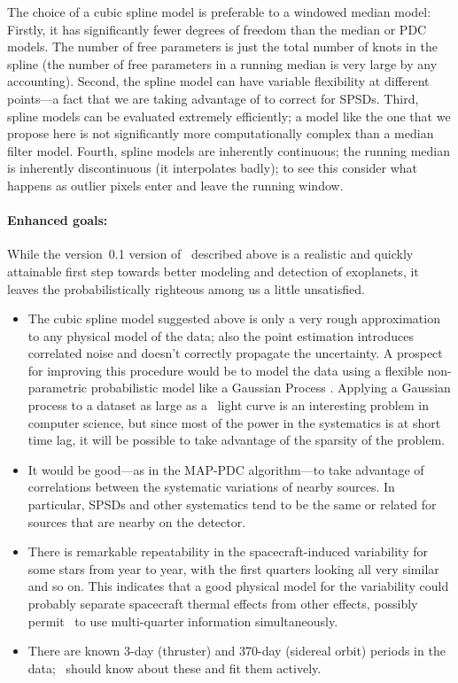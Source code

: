 \documentclass[letterpaper,12pt,preprint]{hack_aastex}
\newcommand{\Untrendy}{\package{Untrendy}}
\begin{document}
The choice of a cubic spline model is
preferable to a windowed median model:
Firstly, it has significantly fewer degrees of freedom than the median or PDC models.
The number of free parameters is just the total number of knots
in the spline (the number of free parameters in a running median is
very large by any
accounting).
Second, the spline model can have variable flexibility at
different points---a fact that we are taking advantage of to correct for
SPSDs.
Third, spline models can be evaluated extremely efficiently; a model
like the one that we propose here is not significantly more computationally
complex than a median filter model.
Fourth, spline models are inherently continuous; the running median is
inherently discontinuous (it interpolates badly); to see this consider what
happens as outlier pixels enter and leave the running window.

\paragraph{Enhanced goals:}
While the version~0.1 version of \Untrendy\ described above is a realistic and
quickly attainable first step towards better modeling and detection of
exoplanets, it leaves the probabilistically
righteous among us a little unsatisfied.
\begin{itemize}
\item
The cubic spline model suggested above is only a very rough approximation to
any physical model of the data; also the point estimation introduces
correlated noise and doesn't
correctly propagate the uncertainty.
A prospect for improving this procedure would be to model the data
using a flexible non-parametric probabilistic model like a Gaussian Process
 \citep{gp}.
Applying a Gaussian process to a dataset as large as a \Kepler\ light curve is
an interesting problem in computer science, but since most of the power in the
systematics is at short time lag, it will be possible to take advantage of
the sparsity of the problem.
\item
It would be good---as in the MAP-PDC
algorithm---to take advantage of correlations between the systematic
variations of nearby sources.
In particular, SPSDs and other
systematics tend to be the same or related for sources that are nearby
on the detector.
\item
There is remarkable repeatability in the spacecraft-induced
variability for some stars from year to year, with the
first quarters looking all very similar and so on.
This indicates that a good physical model for the variability could probably
separate spacecraft thermal effects from other effects, possibly
permit \Untrendy\ to use multi-quarter information simultaneously.
\item
There are known 3-day (thruster) and 370-day (sidereal orbit) periods
in the data; \Untrendy\ should know about these and fit them actively.
\end{itemize}
\end{document}

